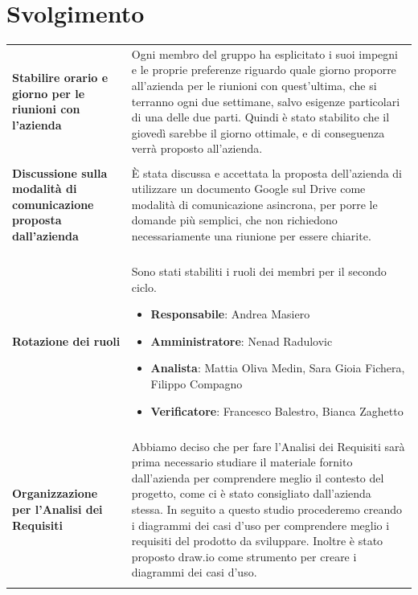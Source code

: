 \documentclass[a4paper,12pt]{article}
\begin{document}
    \section{Svolgimento} {
        \begin{longtable}{P{5cm}|P{10cm}} 
            \textbf{Stabilire orario e giorno per le riunioni con l'azienda} & Ogni membro del gruppo ha esplicitato i suoi impegni e le proprie preferenze riguardo quale giorno proporre all'azienda per le riunioni con quest'ultima, che si terranno ogni due settimane, salvo esigenze particolari di una delle due parti. Quindi è stato stabilito che il giovedì sarebbe il giorno ottimale, e di conseguenza verrà proposto all'azienda. \\\\
            \textbf{Discussione sulla modalità di comunicazione proposta dall'azienda} & È stata discussa e accettata la proposta dell'azienda di utilizzare un documento Google sul Drive come modalità di comunicazione asincrona, per porre le domande più semplici, che non richiedono necessariamente una riunione per essere chiarite.\\\\
            \textbf{Rotazione dei ruoli} & Sono stati stabiliti i ruoli dei membri per il secondo ciclo.
            \begin{itemize}
                \item \textbf{Responsabile}: Andrea Masiero
                \item \textbf{Amministratore}: Nenad Radulovic
                \item \textbf{Analista}: Mattia Oliva Medin, Sara Gioia Fichera, Filippo Compagno
                \item \textbf{Verificatore}: Francesco Balestro, Bianca Zaghetto
            \end{itemize}\\\\
            \textbf{Organizzazione per l'Analisi dei Requisiti} & Abbiamo deciso che per fare l'Analisi dei Requisiti sarà prima necessario studiare il materiale fornito dall'azienda per comprendere meglio il contesto del progetto, come ci è stato consigliato dall'azienda stessa. In seguito a questo studio procederemo creando i diagrammi dei casi d'uso per comprendere meglio i requisiti del prodotto da sviluppare. Inoltre è stato proposto draw.io come strumento per creare i diagrammi dei casi d'uso.\\\\
        \end{longtable}
    }
\end{document}
